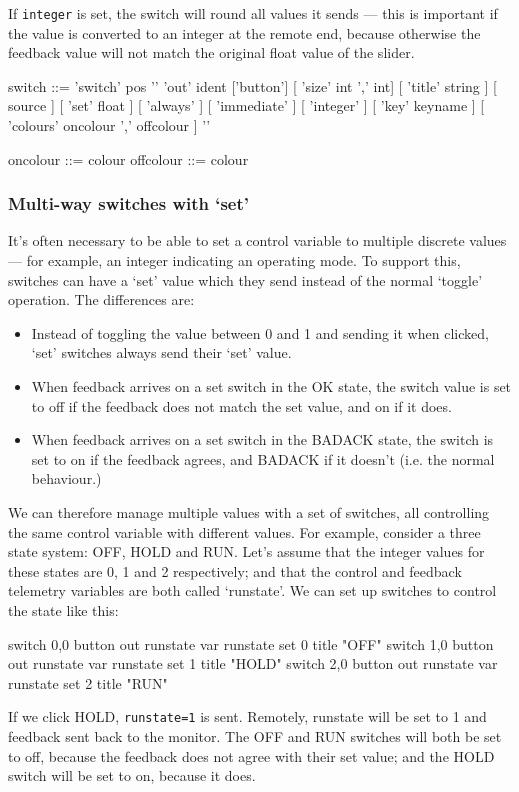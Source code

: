 If \verb+integer+  is set, the switch will round all values it sends --- this is important if the value is converted to an integer
at the remote end, because otherwise the feedback value will not match the original float value of the slider.
\begin{v}
switch      ::= 'switch' pos '{'
                    'out' ident
                    ['button']
                    [ 'size' int ',' int]
                    [ 'title' string ]
                    [ source ]
                    [ 'set' float ]
                    [ 'always' ]
                    [ 'immediate' ]
                    [ 'integer' ]
                    [ 'key' keyname ]
                    [ 'colours' oncolour ',' offcolour ]
                '}'

oncolour    ::= colour
offcolour   ::= colour
\end{v}

\subsubsection{Multi-way switches with `set'}
It's often necessary to be able to set a control variable to multiple discrete values --- for example, an integer indicating an
operating mode. To support this, switches can have a `set' value which they send instead of the normal `toggle' operation. The differences
are:
\begin{itemize}
\item Instead of toggling the value between 0 and 1 and sending it when clicked, `set' switches always send their `set' value.
\item When feedback arrives on a set switch in the OK state, the switch value is set to off if the feedback does not match the set value,
and on if it does.
\item When feedback arrives on a set switch in the BADACK state, the switch is set to on if the feedback agrees, and BADACK if it doesn't (i.e.
the normal behaviour.)
\end{itemize}
We can therefore manage multiple values with a set of switches, all controlling the same control variable with different values. For example,
consider a three state system: OFF, HOLD and RUN. Let's assume that the integer values for these states are 0, 1 and 2 respectively; and that
the control and feedback telemetry variables are both called `runstate'. We can set up switches to control the state like this:
\begin{v}
    switch 0,0 { button out runstate var runstate set 0 title "OFF"}
    switch 1,0 { button out runstate var runstate set 1 title "HOLD"}
    switch 2,0 { button out runstate var runstate set 2 title "RUN"}
\end{v}
If we click HOLD, \texttt{runstate=1} is sent. Remotely, runstate will be set to 1 and feedback
sent back to the monitor. The OFF and RUN switches will both be set to off, because the feedback
does not agree with their set value; and the HOLD switch will be set to on, because it does.

